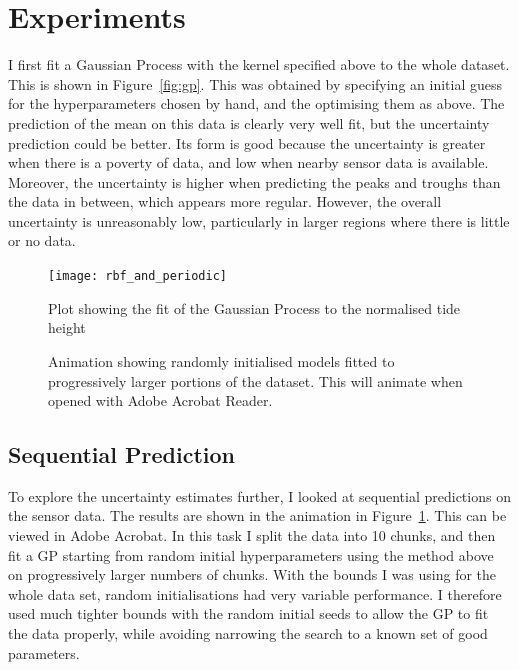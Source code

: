 \documentclass[10pt]{article}
\begin{document}
\section*{Experiments}

I first fit a Gaussian Process with the kernel specified above to the whole dataset. This is shown in Figure~\ref{fig:gp}. 
This was obtained by specifying an initial guess for the hyperparameters chosen by hand, and the optimising them as above. The prediction of
the mean on this data is clearly very well fit, but the uncertainty prediction could be better. Its form is good because the uncertainty is
greater when there is a poverty of data, and low when nearby sensor data is available. Moreover, the uncertainty is higher when predicting the
peaks and troughs than the data in between, which appears more regular. However, the overall uncertainty is unreasonably low, particularly in
larger regions where there is little or no data. 

\begin{figure}
\begin{minipage}{.5\textwidth}
    \centering
    \texttt{[image: rbf\_and\_periodic]}
    \caption{Plot showing the fit of the Gaussian Process to the normalised tide height}\label{fig:gp}
\end{minipage}
\begin{minipage}{.5\textwidth}
    \centering
    \caption{Animation showing randomly initialised models fitted to progressively larger portions of the dataset.
            This will animate when opened with Adobe Acrobat Reader.}\label{fig:seq_prediction}
\end{minipage}
\end{figure}
\subsection*{Sequential Prediction}

To explore the uncertainty estimates further, I looked at sequential predictions on the sensor data. The results are shown in the animation
in Figure~\ref{fig:seq_prediction}. This can be viewed in Adobe Acrobat. In this task I split the data into 10 chunks, and then fit a GP starting
from random initial hyperparameters using the method above on progressively larger numbers of chunks. With the bounds I was using
for the whole data set, random initialisations had very variable performance. I therefore used much tighter bounds with the random initial 
seeds to allow the GP to fit the data properly, while avoiding narrowing the search to a known set of good parameters. 
\end{document}
